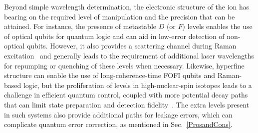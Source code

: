 \documentclass[%
12pt,
 amsmath,amssymb,
]{revtex4-2}
\begin{document}

Beyond simple wavelength determination, the electronic structure of the ion has bearing on the required level of manipulation and the precision that can be attained.  For instance, the presence of metastable $D$ (or $F$) levels enables the use of optical qubits for quantum logic and can aid in low-error detection of non-optical qubits.  However, it also provides a scattering channel during Raman excitation~\cite{PhysRevA.75.042329_2007} and generally leads to the requirement of additional laser wavelengths for repumping or quenching of these levels when necessary.  Likewise, hyperfine structure can enable the use of long-coherence-time FOFI qubits and Raman-based logic, but the proliferation of levels in high-nuclear-spin isotopes leads to a challenge in efficient quantum control, coupled with more potential decay paths that can limit state preparation and detection fidelity~\cite{PhysRevA.79.020304}.  The extra levels present in such systems also provide additional paths for leakage errors, which can complicate quantum error correction, as mentioned in Sec.~\ref{ProsandCons}.
\end{document}
